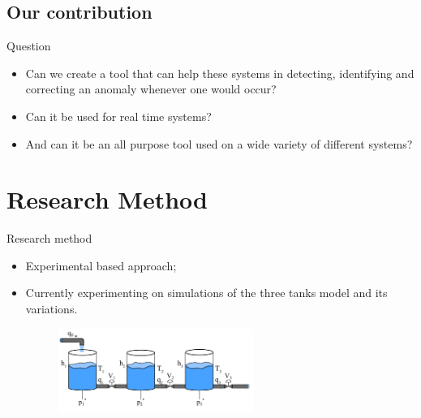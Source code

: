 \documentclass{beamer}
\def\itemizespace{\vspace{7mm}}
\begin{document}
\subsection{Our contribution}
\begin{frame}{Question}
	\begin{itemize}[<+->]
		\item[] Can we create a tool that can help these systems in detecting,
			identifying and correcting an anomaly whenever one would occur?
		
		\itemizespace%

		\item[] Can it be used for real time systems?

		\itemizespace%
			
		\item[] And can it be an all purpose tool used on a wide variety of
			different systems?
	\end{itemize}
\end{frame}


\section{Research Method}
\begin{frame}{Research method}
	\begin{itemize}[<+->]
		\item[] Experimental based approach;

		\itemizespace%

		\item[] Currently experimenting on simulations of the three tanks model
			and its variations.
			\vspace{2mm}
			\begin{figure}
				\centering
				\includegraphics[width=0.6\textwidth]{3-tanks.pdf}
			\end{figure}
	\end{itemize}
\end{frame}

\end{document}
